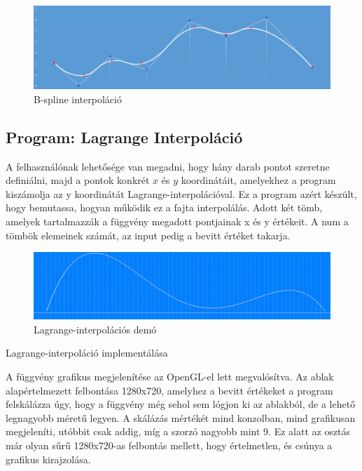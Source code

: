 \begin{figure}[h]
\centering
\includegraphics[scale=0.43]{kepek/bspline_interpol.png}
\caption{B-spline interpoláció}
\label{fig:spline}
\end{figure}

\subsection{Program: Lagrange Interpoláció}

A felhasználónak lehetősége van megadni, hogy hány darab pontot szeretne definiálni, majd a pontok konkrét $x$ és $y$ koordinátáit, amelyekhez a program kiszámolja az y koordinátát Lagrange-interpolációval. Ez a program azért készült, hogy bemutassa, hogyan működik ez a fajta interpolálás.
Adott két tömb, amelyek tartalmazzák a függvény megadott pontjainak x és y értékeit. A num a tömbök elemeinek számát, az input pedig a bevitt értéket takarja.

\begin{figure}[h]
\centering
\includegraphics[scale=0.4]{kepek/lagrange_graphics.png}
\caption{Lagrange-interpolációs demó}
\label{fig:lagrange_demo}
\end{figure}

\begin{algorithm}[H]
 \caption{Lagrange-interpoláció implementálása}
\end{algorithm} 

A függvény grafikus megjelenítése az OpenGL-el lett megvalósítva. Az ablak alapértelmezett felbontása 1280x720, amelyhez a bevitt értékeket a program felskálázza úgy, hogy a függvény még sehol sem lógjon ki az ablakból, de a lehető legnagyobb méretű legyen. A skálázás mértékét mind konzolban, mind grafikusan megjeleníti, utóbbit csak addig, míg a szorzó nagyobb mint 9. Ez alatt az osztás már olyan sűrű 1280x720-as felbontás mellett, hogy értelmetlen, és csúnya a grafikus kirajzolása. 

